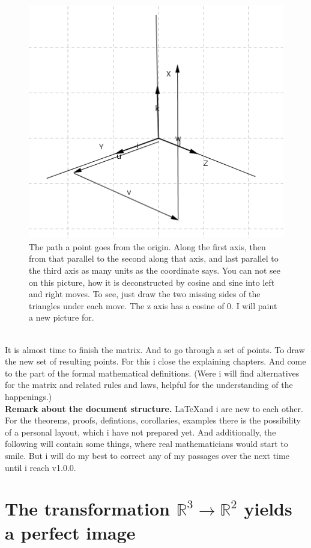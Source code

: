 \documentclass[a4paper]{article}
\begin{document}
\begin{Example}
\begin{figure}[ht]
\includegraphics{pathcoords.png}
\caption{The path a point goes from the origin. Along the first axis, then from that parallel to the second along that axis, and last parallel to the third axis as many units as the coordinate says. You can not see on this picture, how it is deconstructed by cosine and sine into left and right moves. To see, just draw the two missing sides of the triangles under each move. The z axis has a cosine of 0. I will paint a new picture for.}
\end{figure}\\

It is almost time to finish the matrix. And to go through a set of points. To draw the new set of resulting points.
For this i close the explaining chapters. And come to the part of the formal mathematical definitions. (Were i will
find alternatives for the matrix and related rules and laws, helpful for the understanding of the happenings.)\\

\textbf{Remark about the document structure.} \LaTeX and i are new to each other. For the theorems, proofs, defintions, corollaries, examples there is the possibility of a personal layout, which i have not prepared yet. And additionally, the following will contain some things, where real
mathematicians would start to smile. But i will do my best to correct any of my passages over the next time until i reach v1.0.0.\\

\section{The transformation $\mathbb{R}^{3} \rightarrow \mathbb{R}^{2}$ yields a perfect image}


\end{Example}
\end{document}
